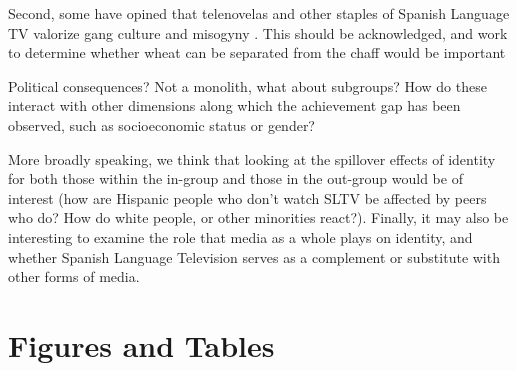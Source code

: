 \documentclass[11pt]{article}
\begin{document}
Second, some have opined that telenovelas and other staples of Spanish Language TV valorize gang culture and misogyny . This should be acknowledged, and work to determine whether wheat can be separated from the chaff would be important


Political consequences?
Not a monolith, what about subgroups? How do these interact with other dimensions along which the achievement gap has been observed, such as socioeconomic status or gender?

More broadly speaking, we think that looking at the spillover effects of identity for both those within the in-group and those in the out-group would be of interest (how are Hispanic people who don't watch SLTV be affected by peers who do? How do white people, or other minorities react?). Finally, it may also be interesting to examine the role that media as a whole plays on identity, and whether Spanish Language Television serves as a complement or substitute with other forms of media.


\clearpage
\pagebreak

\begin{singlespace}
\begin{scriptsize}

%
{}
\end{scriptsize}
\end{singlespace}

\pagebreak
\clearpage

\section*{Figures and Tables}




%
%
\end{document}
